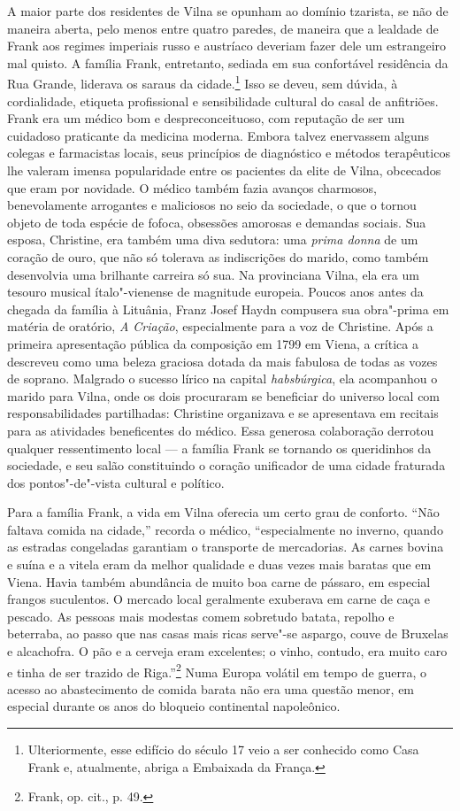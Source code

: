 A maior parte dos residentes de Vilna se opunham ao domínio tzarista, se
não de maneira aberta, pelo menos entre quatro paredes, de maneira que a
lealdade de Frank aos regimes imperiais russo e austríaco deveriam fazer
dele um estrangeiro mal quisto. A família Frank, entretanto, sediada em
sua confortável residência da Rua Grande, liderava os saraus da
cidade.\footnote{Ulteriormente, esse edifício do século 17 veio a ser conhecido como Casa Frank e, atualmente, abriga a Embaixada da França.} Isso se deveu, sem dúvida, à cordialidade, etiqueta profissional e
sensibilidade cultural do casal de anfitriões. Frank era um médico bom e
despreconceituoso, com reputação de ser um cuidadoso praticante da
medicina moderna. Embora talvez enervassem alguns colegas e farmacistas
locais, seus princípios de diagnóstico e métodos terapêuticos lhe
valeram imensa popularidade entre os pacientes da elite de Vilna,
obcecados que eram por novidade. O médico também fazia avanços
charmosos, benevolamente arrogantes e maliciosos no seio da sociedade, o
que o tornou objeto de toda espécie de fofoca, obsessões amorosas e
demandas sociais. Sua esposa, Christine, era também uma diva sedutora:
uma \textit{prima donna} de um coração de ouro, que não só tolerava as
indiscrições do marido, como também desenvolvia uma brilhante carreira
só sua. Na provinciana Vilna, ela era um tesouro musical ítalo"-vienense
de magnitude europeia. Poucos anos antes da chegada da família à
Lituânia, Franz Josef Haydn compusera sua obra"-prima em matéria de
oratório, \textit{A Criação}, especialmente para a voz de Christine. Após
a primeira apresentação pública da composição em 1799 em Viena, a
crítica a descreveu como uma beleza graciosa dotada da mais fabulosa de
todas as vozes de soprano. Malgrado o sucesso lírico na capital
\textit{habsbúrgica}, ela acompanhou o marido para Vilna, onde os dois procuraram
se beneficiar do universo local com responsabilidades partilhadas:
Christine organizava e se apresentava em recitais para as atividades
beneficentes do médico. Essa generosa colaboração derrotou qualquer
ressentimento local --- a família Frank se tornando os queridinhos da
sociedade, e seu salão constituindo o coração unificador de uma cidade
fraturada dos pontos"-de"-vista cultural e político.

Para a família Frank, a vida em Vilna oferecia um certo grau de
conforto. ``Não faltava comida na cidade,'' recorda o médico,
``especialmente no inverno, quando as estradas congeladas garantiam o
transporte de mercadorias. As carnes bovina e suína e a vitela eram da
melhor qualidade e duas vezes mais baratas que em Viena. Havia também
abundância de muito boa carne de pássaro, em especial frangos
suculentos. O mercado local geralmente exuberava em carne de caça e
pescado. As pessoas mais modestas comem sobretudo batata, repolho e
beterraba, ao passo que nas casas mais ricas serve"-se aspargo, couve de
Bruxelas e alcachofra. O pão e a cerveja eram excelentes; o vinho,
contudo, era muito caro e tinha de ser trazido de Riga.''\footnote{Frank, op. cit., p. 49.} Numa Europa volátil em tempo de guerra, o acesso ao abastecimento de comida barata não era uma questão menor, em especial
durante os anos do bloqueio continental napoleônico.

